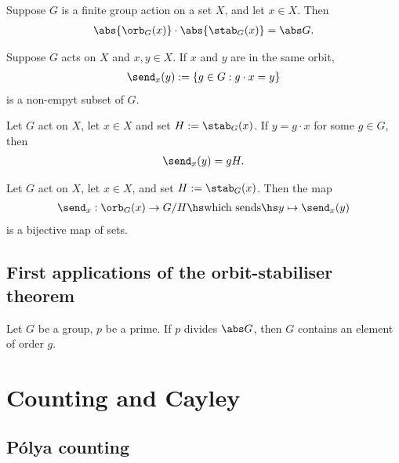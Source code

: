 \documentclass{article}
\begin{document}
\begin{theorem}
    Suppose $G$ is a finite group action on a set $X$, and let $x\in X$.
    Then
    \begin{align*}
        \abs{\orb_G(x)}\cdot \abs{\stab_G(x)}=\abs G.
    \end{align*}
\end{theorem}

\begin{definition}
    Suppose $G$ acts on $X$ and $x,y\in X$. If $x$ and $y$
    are in the same orbit,
    \begin{align*}
        \send_x(y):=\{g\in G : g\cdot x = y\}
    \end{align*}
    is a non-empyt subset of $G$.
\end{definition}

\begin{proposition}
    Let $G$ act on $X$, let $x\in X$ and set $H:=\stab_G(x)$.
    If $y=g\cdot x$ for some $g\in G$, then
    \begin{align*}
        \send_x(y) = gH.
    \end{align*}
\end{proposition}

\begin{theorem}
    Let $G$ act on $X$, let $x\in X$, and set $H:=\stab_G(x)$.
    Then the map
    \begin{align*}
        \send_x:\orb_G(x)\to G/H \hs\text{which sends}\hs y\mapsto \send_x(y)
    \end{align*}
    is a bijective map of sets.
\end{theorem}

\subsection{First applications of the orbit-stabiliser theorem}

\begin{theorem}
    Let $G$ be a group, $p$ be a prime. If $p$ divides $\abs G$,
    then $G$ contains an element of order $g$.
\end{theorem}


\section{Counting and Cayley}

\subsection{P\'olya counting}
\end{document}
